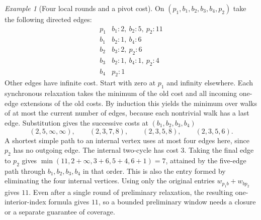 \documentclass[11pt,reqno]{amsart}
\theoremstyle{definition}
\theoremstyle{remark}
\newtheorem{example}[theorem]{Example}
\numberwithin{equation}{section}
\begin{document}
\begin{example}[Four local rounds and a pivot cost]\label{m5:six}
On \((p_1,b_1,b_2,b_3,b_4,p_2)\) take the following directed edges:
\[
\begin{array}{c|l}
p_1 & b_1:2,\ b_2:5,\ p_2:11\\
b_1 & b_2:1,\ b_4:6\\
b_2 & b_3:2,\ p_2:6\\
b_3 & b_2:1,\ b_4:1,\ p_2:4\\
b_4 & p_2:1
\end{array}
\]
Other edges have infinite cost. Start with zero at \(p_1\) and infinity
elsewhere. Each synchronous relaxation takes the minimum of the old
cost and all incoming one-edge extensions of the old costs. By induction
this yields the minimum over walks of at most the current number of
edges, because each nontrivial walk has a last edge. Substitution
gives the successive costs at \((b_1,b_2,b_3,b_4)\)
\[
(2,5,\infty,\infty),\qquad (2,3,7,8),\qquad
(2,3,5,8),\qquad (2,3,5,6).
\]
A shortest simple path to an internal vertex uses at most four edges
here, since \(p_2\) has no outgoing edge. The internal two-cycle has
cost \(3\). Taking the final edge to \(p_2\) gives
\(\min(11,2+\infty,3+6,5+4,6+1)=7\), attained by the five-edge
path through \(b_1,b_2,b_3,b_4\) in that order. This is also the
entry formed by eliminating the four internal vertices.
Using only the original entries \(w_{p_1b}+w_{bp_2}\) gives \(11\).
Even after a single round of preliminary relaxation, the resulting
one-interior-index formula gives \(11\), so a bounded preliminary
window needs a closure or a separate guarantee of coverage.
\end{example}
\end{document}

